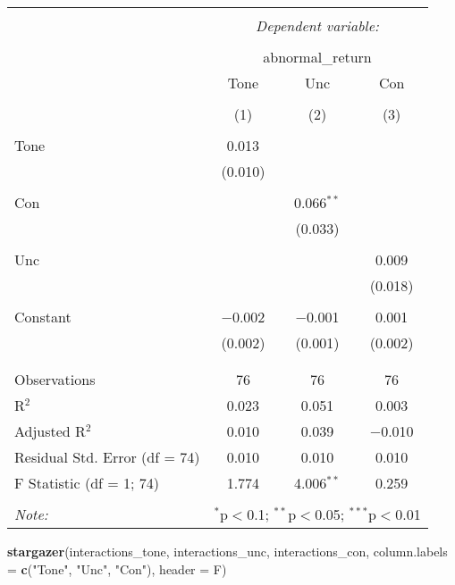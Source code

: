 \documentclass[
]{article}
\newenvironment{Shaded}{\begin{snugshade}}{\end{snugshade}}
\newcommand{\AttributeTok}[1]{\textcolor[rgb]{0.13,0.29,0.53}{#1}}
\newcommand{\FunctionTok}[1]{\textcolor[rgb]{0.13,0.29,0.53}{\textbf{#1}}}
\newcommand{\NormalTok}[1]{#1}
\newcommand{\StringTok}[1]{\textcolor[rgb]{0.31,0.60,0.02}{#1}}
\begin{document}
\begin{table}[!htbp] \centering 
  \caption{} 
  \label{} 
\begin{tabular}{@{\extracolsep{5pt}}lccc} 
\\[-1.8ex]\hline 
\hline \\[-1.8ex] 
 & \multicolumn{3}{c}{\textit{Dependent variable:}} \\ 
\cline{2-4} 
\\[-1.8ex] & \multicolumn{3}{c}{abnormal\_return} \\ 
 & Tone & Unc & Con \\ 
\\[-1.8ex] & (1) & (2) & (3)\\ 
\hline \\[-1.8ex] 
 Tone & 0.013 &  &  \\ 
  & (0.010) &  &  \\ 
  & & & \\ 
 Con &  & 0.066$^{**}$ &  \\ 
  &  & (0.033) &  \\ 
  & & & \\ 
 Unc &  &  & 0.009 \\ 
  &  &  & (0.018) \\ 
  & & & \\ 
 Constant & $-$0.002 & $-$0.001 & 0.001 \\ 
  & (0.002) & (0.001) & (0.002) \\ 
  & & & \\ 
\hline \\[-1.8ex] 
Observations & 76 & 76 & 76 \\ 
R$^{2}$ & 0.023 & 0.051 & 0.003 \\ 
Adjusted R$^{2}$ & 0.010 & 0.039 & $-$0.010 \\ 
Residual Std. Error (df = 74) & 0.010 & 0.010 & 0.010 \\ 
F Statistic (df = 1; 74) & 1.774 & 4.006$^{**}$ & 0.259 \\ 
\hline 
\hline \\[-1.8ex] 
\textit{Note:}  & \multicolumn{3}{r}{$^{*}$p$<$0.1; $^{**}$p$<$0.05; $^{***}$p$<$0.01} \\ 
\end{tabular} 
\end{table}

\begin{Shaded}
\begin{Highlighting}[]
\FunctionTok{stargazer}\NormalTok{(interactions\_tone, interactions\_unc, interactions\_con,}
          \AttributeTok{column.labels =} \FunctionTok{c}\NormalTok{(}\StringTok{"Tone"}\NormalTok{, }\StringTok{"Unc"}\NormalTok{, }\StringTok{"Con"}\NormalTok{), }\AttributeTok{header =}\NormalTok{ F)}
\end{Highlighting}
\end{Shaded}
\end{document}

